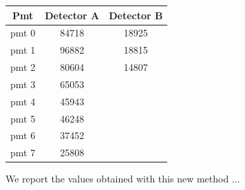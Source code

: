 \begin{center}
\begin{tabular}{|c|c|c|}
\hline 
Pmt & Detector A & Detector B \\ 
\hline 
pmt 0 & 84718 & 18925 \\ 
\hline 
pmt 1 & 96882 & 18815 \\ 
\hline 
pmt 2 & 80604 & 14807 \\ 
\hline 
pmt 3 & 65053 & \\ 
\hline 
pmt 4 & 45943 & \\ 
\hline 
pmt 5 & 46248 & \\ 
\hline 
pmt 6 & 37452 & \\ 
\hline 
pmt 7 & 25808 & \\ 
\hline 
\end{tabular} 
\end{center}
 
We report the values obtained with this new method ... 

\begin{figure}[hbtp]
\centering
{}
\end{figure}

